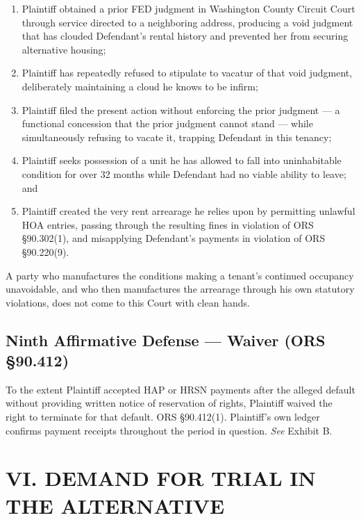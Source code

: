 \documentclass[12pt,letterpaper]{article}
\begin{document}
	\begin{enumerate}
		\item Plaintiff obtained a prior FED judgment in Washington County Circuit Court through service directed to a neighboring address, producing a void judgment that has clouded Defendant's rental history and prevented her from securing alternative housing;
		\item Plaintiff has repeatedly refused to stipulate to vacatur of that void judgment, deliberately maintaining a cloud he knows to be infirm;
		\item Plaintiff filed the present action without enforcing the prior judgment --- a functional concession that the prior judgment cannot stand --- while simultaneously refusing to vacate it, trapping Defendant in this tenancy;
		\item Plaintiff seeks possession of a unit he has allowed to fall into uninhabitable condition for over 32 months while Defendant had no viable ability to leave; and
		\item Plaintiff created the very rent arrearage he relies upon by permitting unlawful HOA entries, passing through the resulting fines in violation of ORS \S90.302(1), and misapplying Defendant's payments in violation of ORS \S90.220(9).
	\end{enumerate}
	
	A party who manufactures the conditions making a tenant's continued occupancy unavoidable, and who then manufactures the arrearage through his own statutory violations, does not come to this Court with clean hands.
	
	\subsection{Ninth Affirmative Defense --- Waiver (ORS \S90.412)}
	
	To the extent Plaintiff accepted HAP or HRSN payments after the alleged default without providing written notice of reservation of rights, Plaintiff waived the right to terminate for that default. ORS \S90.412(1). Plaintiff's own ledger confirms payment receipts throughout the period in question. \textit{See} Exhibit B.
	
	\section*{VI. DEMAND FOR TRIAL IN THE ALTERNATIVE}
	
\end{document}
